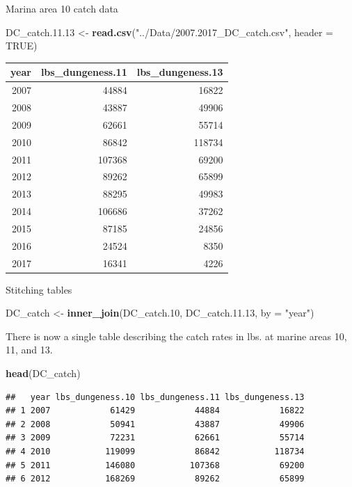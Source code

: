 \documentclass[ignorenonframetext,]{beamer}
\newenvironment{Shaded}{\begin{snugshade}}{\end{snugshade}}
\newcommand{\KeywordTok}[1]{\textcolor[rgb]{0.13,0.29,0.53}{\textbf{#1}}}
\newcommand{\DataTypeTok}[1]{\textcolor[rgb]{0.13,0.29,0.53}{#1}}
\newcommand{\DecValTok}[1]{\textcolor[rgb]{0.00,0.00,0.81}{#1}}
\newcommand{\FloatTok}[1]{\textcolor[rgb]{0.00,0.00,0.81}{#1}}
\newcommand{\StringTok}[1]{\textcolor[rgb]{0.31,0.60,0.02}{#1}}
\newcommand{\OtherTok}[1]{\textcolor[rgb]{0.56,0.35,0.01}{#1}}
\newcommand{\NormalTok}[1]{#1}
\begin{document}
\begin{frame}[fragile]{Marina area 10 catch data}

\begin{Shaded}
\begin{Highlighting}[]
\NormalTok{DC_catch.}\FloatTok{11.13}\NormalTok{ <-}\StringTok{ }\KeywordTok{read.csv}\NormalTok{(}\StringTok{"../Data/2007.2017_DC_catch.csv"}\NormalTok{, }\DataTypeTok{header =} \OtherTok{TRUE}\NormalTok{)}
\end{Highlighting}
\end{Shaded}

\begin{longtable}[]{@{}rrr@{}}
\toprule
year & lbs\_dungeness.11 & lbs\_dungeness.13\tabularnewline
\midrule
\endhead
2007 & 44884 & 16822\tabularnewline
2008 & 43887 & 49906\tabularnewline
2009 & 62661 & 55714\tabularnewline
2010 & 86842 & 118734\tabularnewline
2011 & 107368 & 69200\tabularnewline
2012 & 89262 & 65899\tabularnewline
2013 & 88295 & 49983\tabularnewline
2014 & 106686 & 37262\tabularnewline
2015 & 87185 & 24856\tabularnewline
2016 & 24524 & 8350\tabularnewline
2017 & 16341 & 4226\tabularnewline
\bottomrule
\end{longtable}

\end{frame}

\begin{frame}[fragile]{Stitching tables}

\begin{Shaded}
\begin{Highlighting}[]
\NormalTok{DC_catch <-}\StringTok{ }\KeywordTok{inner_join}\NormalTok{(DC_catch.}\DecValTok{10}\NormalTok{, DC_catch.}\FloatTok{11.13}\NormalTok{, }\DataTypeTok{by =} \StringTok{"year"}\NormalTok{)}
\end{Highlighting}
\end{Shaded}

There is now a single table describing the catch rates in lbs. at marine
areas 10, 11, and 13.

\begin{Shaded}
\begin{Highlighting}[]
\KeywordTok{head}\NormalTok{(DC_catch)}
\end{Highlighting}
\end{Shaded}

\begin{verbatim}
##   year lbs_dungeness.10 lbs_dungeness.11 lbs_dungeness.13
## 1 2007            61429            44884            16822
## 2 2008            50941            43887            49906
## 3 2009            72231            62661            55714
## 4 2010           119099            86842           118734
## 5 2011           146080           107368            69200
## 6 2012           168269            89262            65899
\end{verbatim}

\end{frame}
\end{document}
